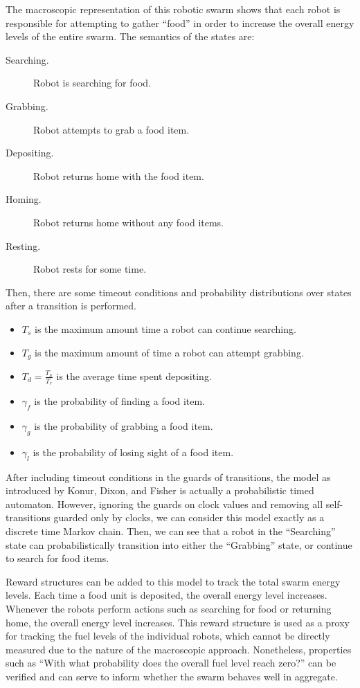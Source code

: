 \documentclass[11pt]{article}
\theoremstyle{definition}
\begin{document}
The macroscopic representation of this robotic swarm shows that each robot is
responsible for attempting to gather ``food'' in order to increase the overall
energy levels of the entire swarm. The semantics of the states are:
%
\begin{description}
    \item[Searching.] Robot is searching for food.
    \item[Grabbing.] Robot attempts to grab a food item.
    \item[Depositing.] Robot returns home with the food item.
    \item[Homing.] Robot returns home without any food items.
    \item[Resting.] Robot rests for some time.
\end{description}

Then, there are some timeout conditions and probability
distributions over states after a transition is performed.
%
\begin{itemize}
    \item
        $ T_s $ is the maximum amount time a robot can continue searching.
    \item
        $ T_g $ is the maximum amount of time a robot can attempt grabbing.
    \item
        $ T_d = \frac{T_h}{T_r} $ is the average time spent depositing.
    \item
        $ \gamma_f $ is the probability of finding a food item.
    \item
        $ \gamma_g $ is the probability of grabbing a food item.
    \item
        $ \gamma_l $ is the probability of losing sight of a food item.
\end{itemize}

After including timeout conditions in the guards of transitions, the model as
introduced by Konur, Dixon, and Fisher is actually a probabilistic timed
automaton.
However, ignoring the guards on clock values and removing all self-transitions
guarded only by clocks, we can consider this model exactly as a discrete time
Markov chain.
Then, we can see that a robot in the ``Searching'' state can probabilistically
transition into either the ``Grabbing'' state, or continue to search for food
items.

Reward structures can be added to this model to track the total swarm energy
levels.
Each time a food unit is deposited, the overall energy level increases.
Whenever the robots perform actions such as searching for food or returning
home, the overall energy level increases.
This reward structure is used as a proxy for tracking the fuel levels of the
individual robots, which cannot be directly measured due to the nature of the
macroscopic approach.
Nonetheless, properties such as ``With what probability does the overall fuel
level reach zero?'' can be verified and can serve to inform whether the swarm
behaves well in aggregate.
\end{document}
